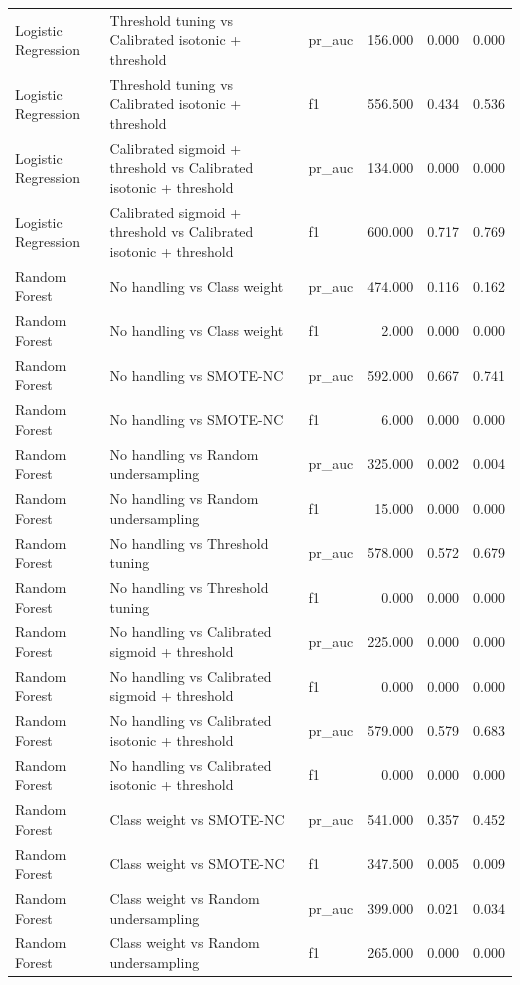 \begin{tabular}{lllrrr}
Logistic Regression & Threshold tuning vs Calibrated isotonic + threshold & pr_auc & 156.000 & 0.000 & 0.000 \\
Logistic Regression & Threshold tuning vs Calibrated isotonic + threshold & f1 & 556.500 & 0.434 & 0.536 \\
Logistic Regression & Calibrated sigmoid + threshold vs Calibrated isotonic + threshold & pr_auc & 134.000 & 0.000 & 0.000 \\
Logistic Regression & Calibrated sigmoid + threshold vs Calibrated isotonic + threshold & f1 & 600.000 & 0.717 & 0.769 \\
Random Forest & No handling vs Class weight & pr_auc & 474.000 & 0.116 & 0.162 \\
Random Forest & No handling vs Class weight & f1 & 2.000 & 0.000 & 0.000 \\
Random Forest & No handling vs SMOTE-NC & pr_auc & 592.000 & 0.667 & 0.741 \\
Random Forest & No handling vs SMOTE-NC & f1 & 6.000 & 0.000 & 0.000 \\
Random Forest & No handling vs Random undersampling & pr_auc & 325.000 & 0.002 & 0.004 \\
Random Forest & No handling vs Random undersampling & f1 & 15.000 & 0.000 & 0.000 \\
Random Forest & No handling vs Threshold tuning & pr_auc & 578.000 & 0.572 & 0.679 \\
Random Forest & No handling vs Threshold tuning & f1 & 0.000 & 0.000 & 0.000 \\
Random Forest & No handling vs Calibrated sigmoid + threshold & pr_auc & 225.000 & 0.000 & 0.000 \\
Random Forest & No handling vs Calibrated sigmoid + threshold & f1 & 0.000 & 0.000 & 0.000 \\
Random Forest & No handling vs Calibrated isotonic + threshold & pr_auc & 579.000 & 0.579 & 0.683 \\
Random Forest & No handling vs Calibrated isotonic + threshold & f1 & 0.000 & 0.000 & 0.000 \\
Random Forest & Class weight vs SMOTE-NC & pr_auc & 541.000 & 0.357 & 0.452 \\
Random Forest & Class weight vs SMOTE-NC & f1 & 347.500 & 0.005 & 0.009 \\
Random Forest & Class weight vs Random undersampling & pr_auc & 399.000 & 0.021 & 0.034 \\
Random Forest & Class weight vs Random undersampling & f1 & 265.000 & 0.000 & 0.000 \\

\end{tabular}
